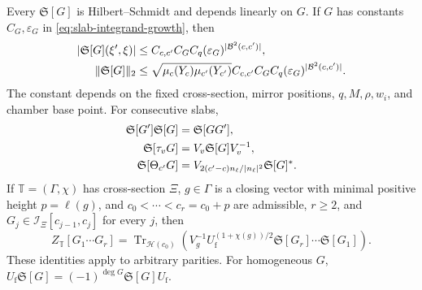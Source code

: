 \begin{proposition}\label{thm:slab-operators}
Every $\mathfrak S[G]$ is Hilbert--Schmidt and depends linearly on $G$.
If $G$ has constants $C_G,\varepsilon_G$ in
\eqref{eq:slab-integrand-growth}, then
\begin{align}\label{eq:slab-kernel-bound}
 |\mathfrak S[G](\xi',\xi)|
    &\le C_{c,c'}C_GC_q(\varepsilon_G)^{|\mathcal B^2(c,c')|},\notag\\
 \|\mathfrak S[G]\|_2
    &\le\sqrt{\mu_c(Y_c)\mu_{c'}(Y_{c'})}
                C_{c,c'}C_GC_q(\varepsilon_G)^{|\mathcal B^2(c,c')|}.
\end{align}
The constant depends on the fixed cross-section, mirror positions,
$q,M,\rho,w_i$, and chamber base point. For consecutive slabs,
\begin{align}\label{eq:slab-operator-rules}
 \mathfrak S[G']\mathfrak S[G]&=\mathfrak S[GG'],\notag\\
 \mathfrak S[\tau_vG]&=V_v\mathfrak S[G]V_v^{-1},\\
 \mathfrak S[\Theta_{c'}G]&=V_{2(c'-c)n_\ell/|n_\ell|^2}
                                         \mathfrak S[G]^*.\notag
\end{align}
If $\mathbb T=(\Gamma,\chi)$ has cross-section $\Xi$, $g\in\Gamma$
is a closing vector with minimal positive height $p=\ell(g)$, and
$c_0<\cdots<c_r=c_0+p$ are admissible, $r\ge2$, and
$G_j\in\mathcal I_\Xi[c_{j-1},c_j]$ for every $j$, then
\begin{equation}\label{eq:slab-trace}
 Z_{\mathbb T}[G_1\cdots G_r]
    =\operatorname{Tr}_{\mathcal H(c_0)}
       \left(V_g^{-1}U_{\mathrm f}^{(1+\chi(g))/2}
               \mathfrak S[G_r]\cdots\mathfrak S[G_1]\right).
\end{equation}
These identities apply to arbitrary parities. For homogeneous $G$,
$U_{\mathrm f}\mathfrak S[G]=(-1)^{\deg G}\mathfrak S[G]U_{\mathrm f}$.
\end{proposition}


